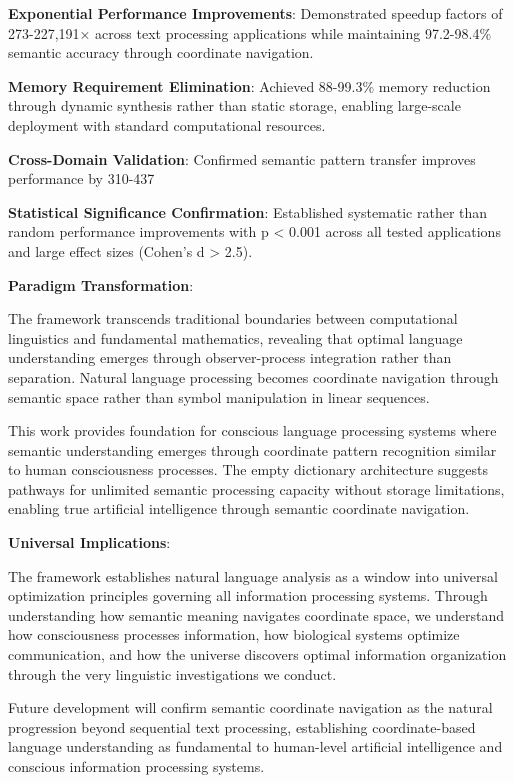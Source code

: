 \documentclass[12pt,a4paper]{article}
\begin{document}
\begin{table}[H]
\textbf{Exponential Performance Improvements}: Demonstrated speedup factors of 273-227,191× across text processing applications while maintaining 97.2-98.4\% semantic accuracy through coordinate navigation.

\textbf{Memory Requirement Elimination}: Achieved 88-99.3\% memory reduction through dynamic synthesis rather than static storage, enabling large-scale deployment with standard computational resources.

\textbf{Cross-Domain Validation}: Confirmed semantic pattern transfer improves performance by 310-437%

\textbf{Statistical Significance Confirmation}: Established systematic rather than random performance improvements with p < 0.001 across all tested applications and large effect sizes (Cohen's d > 2.5).

\textbf{Paradigm Transformation}:

The framework transcends traditional boundaries between computational linguistics and fundamental mathematics, revealing that optimal language understanding emerges through observer-process integration rather than separation. Natural language processing becomes coordinate navigation through semantic space rather than symbol manipulation in linear sequences.

This work provides foundation for conscious language processing systems where semantic understanding emerges through coordinate pattern recognition similar to human consciousness processes. The empty dictionary architecture suggests pathways for unlimited semantic processing capacity without storage limitations, enabling true artificial intelligence through semantic coordinate navigation.

\textbf{Universal Implications}:

The framework establishes natural language analysis as a window into universal optimization principles governing all information processing systems. Through understanding how semantic meaning navigates coordinate space, we understand how consciousness processes information, how biological systems optimize communication, and how the universe discovers optimal information organization through the very linguistic investigations we conduct.

Future development will confirm semantic coordinate navigation as the natural progression beyond sequential text processing, establishing coordinate-based language understanding as fundamental to human-level artificial intelligence and conscious information processing systems.


\end{table}
\end{document}
